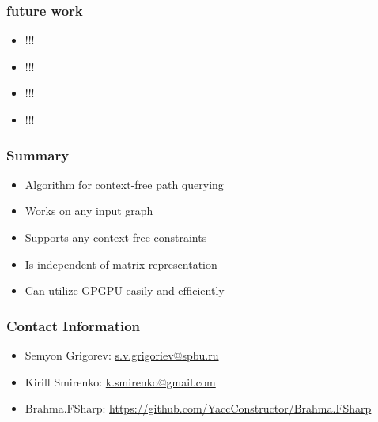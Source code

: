 \documentclass[xcolor=table]{beamer}
\begin{document}
\begin{frame}
  \transwipe[direction=90]
  \frametitle{future work}         
\begin{itemize}
\item !!!
\item !!!
\item !!!
\item !!!
\end{itemize}
\end{frame}     
            
            
\begin{frame}
  \transwipe[direction=90]
  \frametitle{Summary}         
\begin{itemize}
\item Algorithm for context-free path querying 
\item Works on any input graph
\item Supports any context-free constraints 
\item Is independent of matrix representation
\item Can utilize GPGPU easily and efficiently 
\end{itemize}
\end{frame}           
            
\begin{frame}
\transwipe[direction=90]
\frametitle{Contact Information}
\begin{itemize}
  \item Semyon Grigorev: \href{mailto:s.v.grigoriev@spbu.ru}{s.v.grigoriev@spbu.ru}
  \item Kirill Smirenko: \href{mailto:k.smirenko@gmail.com}{k.smirenko@gmail.com}
\end{itemize}
\begin{itemize}
  \item Brahma.FSharp: \href{https://github.com/YaccConstructor/Brahma.FSharp}{https://github.com/YaccConstructor/Brahma.FSharp}
\end{itemize}
\hspace{2cm}
\end{frame}
\end{document}
